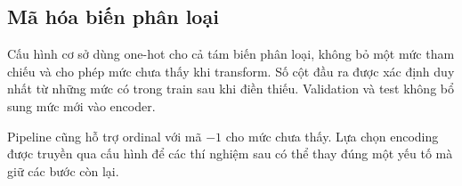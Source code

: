 \subsection{Mã hóa biến phân loại}
\label{subsec:4_3_2}
Cấu hình cơ sở dùng one-hot cho cả tám biến phân loại, không bỏ một mức tham chiếu và cho phép mức chưa thấy khi transform. Số cột đầu ra được xác định duy nhất từ những mức có trong train sau khi điền thiếu. Validation và test không bổ sung mức mới vào encoder.

Pipeline cũng hỗ trợ ordinal với mã $-1$ cho mức chưa thấy. Lựa chọn encoding được truyền qua cấu hình để các thí nghiệm sau có thể thay đúng một yếu tố mà giữ các bước còn lại.
